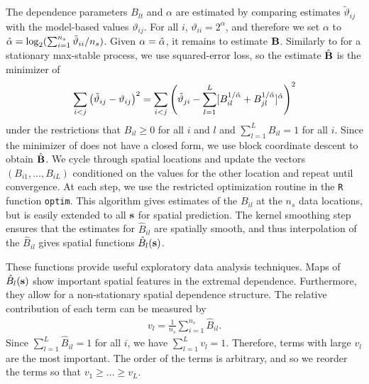 \documentclass[11pt]{article}
\begin{document}
The dependence parameters $B_{lt}$ and $\alpha$ are estimated by comparing estimates ${\tilde \vartheta}_{ij}$ with the model-based values $\vartheta_{ij}$.
For all $i$, $\vartheta_{ii} = 2^{\alpha}$, and therefore we set $\alpha$ to $\hat{\alpha} = \log_2(\sum_{i=1}^{n_s}{\tilde \vartheta}_{ii}/n_s)$.
Given $\alpha=\hat{\alpha}$, it remains to estimate $\mbox{\bf B}$.
Similarly to \citet{Smith1990} for a stationary max-stable process, we use squared-error loss, so the estimate $\hat{\mbox{\bf B}}$ is the minimizer of
\begin{align} \label{ebeq:Bhat}
\sum_{i<j} \left({\tilde \vartheta}_{ij} - \vartheta_{ij}\right)^2
  =
  \sum_{i<j} \left({\tilde \vartheta}_{ji} - \sum_{l=1}^L[B_{il}^{1/\hat{\alpha}} + B_{jl}^{1/\hat{\alpha}}]^{\hat{\alpha}}\right)^2
\end{align}
under the restrictions that $B_{il}\ge 0$ for all $i$ and $l$ and $\sum_{l=1}^LB_{il}=1$ for all $i$.
Since the minimizer of  does not have a closed form, we use block coordinate descent to obtain ${\hat {\mbox{\bf B}}}$.
We cycle through spatial locations and update the vectors $(B_{i1},...,B_{iL})$ conditioned on the values for the other location and repeat until convergence.
At each step, we use the restricted optimization routine in the \texttt{R} function \texttt{optim}.
This algorithm gives estimates of the $B_{il}$ at the $n_s$ data locations, but is easily extended to all $\mbox{\bf s}$ for spatial prediction.
The kernel smoothing step ensures that the estimates for $\hat{B}_{il}$ are spatially smooth, and thus interpolation of the $\hat{B}_{il}$ gives spatial functions $\hat{B}_l(\mbox{\bf s})$.

These functions provide useful exploratory data analysis techniques.
Maps of $\hat{B}_l(\mbox{\bf s})$ show important spatial features in the extremal dependence.
Furthermore, they allow for a non-stationary spatial dependence structure.
The relative contribution of each term can be measured by
\begin{align} \label{ebeq:v}
v_l = \frac{1}{n_s}\sum_{i=1}^{n_s}{\hat B}_{il}.
\end{align}
Since $\sum_{l=1}^L{\hat B}_{il}=1$ for all $i$, we have $\sum_{l=1}^Lv_l = 1$.
Therefore, terms with large $v_l$ are the most important.
The order of the terms is arbitrary, and so we reorder the terms so that $v_1\ge \ldots \ge v_L$.
\end{document}
